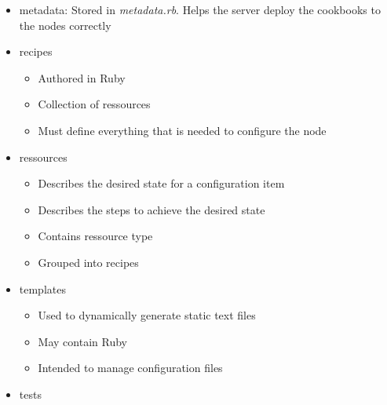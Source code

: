 \begin{itemize}
\begin{itemize}
		\item metadata: Stored in \textit{metadata.rb}. Helps the server deploy the cookbooks to the nodes correctly
		\item recipes
		\begin{itemize}
			\item Authored in Ruby
			\item Collection of ressources
			\item Must define everything that is needed to configure the node
		\end{itemize}
		\item ressources
		\begin{itemize}
			\item Describes the desired state for a configuration item
			\item Describes the steps to achieve the desired state
			\item Contains ressource type
			\item Grouped into recipes
		\end{itemize}
		\item templates
		\begin{itemize}
			\item Used to dynamically generate static text files
			\item May contain Ruby
			\item Intended to manage configuration files
		\end{itemize}
		\item tests
	\end{itemize}
\end{itemize}

